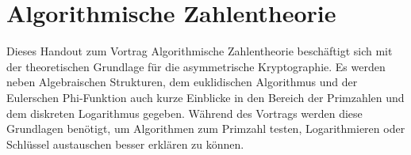 \chapter*{Algorithmische Zahlentheorie}\label{Algorithmische Zahlentheorie}
	\wup Dieses Handout zum Vortrag Algorithmische Zahlentheorie beschäftigt sich mit der theoretischen Grundlage für die asymmetrische Kryptographie. Es werden neben Algebraischen Strukturen, dem euklidischen Algorithmus und der Eulerschen Phi-Funktion auch kurze Einblicke in den Bereich der Primzahlen und dem diskreten Logarithmus gegeben. Während des Vortrags werden diese Grundlagen benötigt, um Algorithmen zum Primzahl testen, Logarithmieren oder Schlüssel austauschen besser erklären zu können.
